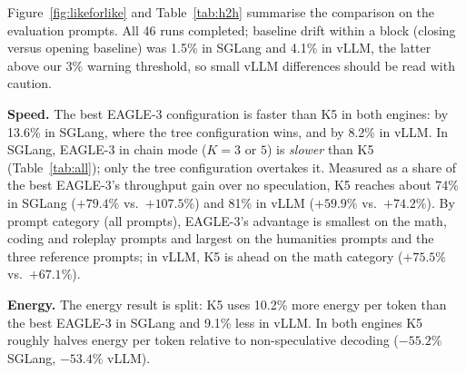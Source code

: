 \documentclass[conference]{IEEEtran}
\begin{document}
Figure~\ref{fig:likeforlike} and Table~\ref{tab:h2h} summarise the
comparison on the evaluation prompts. All 46 runs completed; baseline
drift within a block (closing versus opening baseline) was 1.5\% in SGLang
and 4.1\% in vLLM, the latter above our 3\% warning threshold, so small
vLLM differences should be read with caution.

\begin{table}[t]
\centering
\caption{K5 relative to the best configuration of each other method
(evaluation prompts, 13). Speed: positive means K5 is faster. Energy:
negative means K5 uses less energy per token.}
\label{tab:h2h}
\setlength{\tabcolsep}{3pt}
\end{table}

\textbf{Speed.} The best EAGLE-3 configuration is faster than K5 in both
engines: by 13.6\% in SGLang, where the tree configuration wins, and by
8.2\% in vLLM. In SGLang, EAGLE-3 in chain mode ($K{=}3$ or $5$) is
\emph{slower} than K5 (Table~\ref{tab:all}); only the tree configuration
overtakes it. Measured as a share of the best EAGLE-3's throughput gain
over no speculation, K5 reaches about 74\% in SGLang
($+79.4\%$ vs.\ $+107.5\%$) and 81\% in vLLM ($+59.9\%$ vs.\ $+74.2\%$).
By prompt category (all prompts), EAGLE-3's advantage is smallest on the
math, coding and roleplay prompts and largest on the humanities prompts and
the three reference prompts; in vLLM, K5 is ahead on the math category
($+75.5\%$ vs.\ $+67.1\%$).

\textbf{Energy.} The energy result is split: K5 uses 10.2\% more energy
per token than the best EAGLE-3 in SGLang and 9.1\% less in vLLM. In both
engines K5 roughly halves energy per token relative to non-speculative
decoding ($-55.2\%$ SGLang, $-53.4\%$ vLLM).
\end{document}
